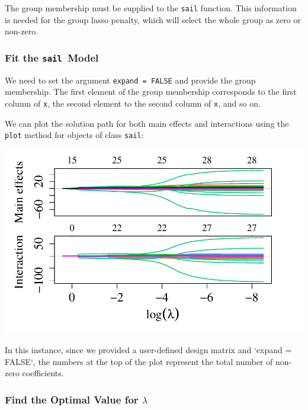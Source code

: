 \documentclass[12pt,letter]{article}\usepackage[]{graphicx}\usepackage[]{color}
\newenvironment{knitrout}{}{} %
\newcommand{\sail}{\texttt{sail}}
\begin{document}
The group membership must be supplied to the \texttt{sail} function. This information is needed for the group lasso penalty, which will select the whole group as zero or non-zero.

\subsubsection{Fit the \sail ~Model}

We need to set the argument \texttt{expand = FALSE} and provide the group membership. The first element of the group membership corresponds to the first column of \texttt{x}, the second element to the second column of \texttt{x}, and so on.



We can plot the solution path for both main effects and interactions using the \texttt{plot} method for objects of class \texttt{sail}:

\begin{knitrout}\scriptsize
{}\color{fgcolor}

{\centering \includegraphics[width=1\linewidth]{figure/sail-expand-false-1} 

}



\end{knitrout}

In this instance, since we provided a user-defined design matrix and `expand = FALSE`, the numbers at the top of the plot represent the total number of non-zero coefficients.


\subsubsection{Find the Optimal Value for $\lambda$}
\end{document}
